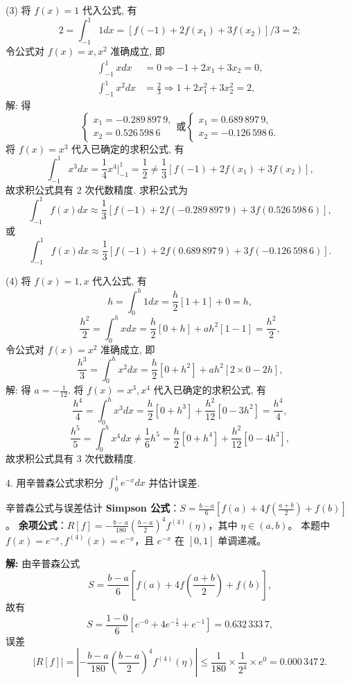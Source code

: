 \documentclass[a4paper,11pt]{ctexart}
\begin{document}
(3) 将 $f(x) = 1$ 代入公式, 有
\[
2 = \int_{-1}^1 1 dx = [f(-1) + 2f(x_1) + 3f(x_2)]/3 = 2;
\]
令公式对 $f(x) = x, x^2$ 准确成立, 即
\begin{align*}
\int_{-1}^1 x dx &= 0 \Rightarrow -1 + 2x_1 + 3x_2 = 0, \\
\int_{-1}^1 x^2 dx &= \frac{2}{3} \Rightarrow 1 + 2x_1^2 + 3x_2^2 = 2,
\end{align*}
解: 得
\[
\begin{cases}
x_1 = -0.289\,897\,9, \\
x_2 = 0.526\,598\,6
\end{cases}
\text{或}
\begin{cases}
x_1 = 0.689\,897\,9, \\
x_2 = -0.126\,598\,6.
\end{cases}
\]
将 $f(x) = x^3$ 代入已确定的求积公式, 有
\[
\int_{-1}^1 x^3 dx = \frac{1}{4}x^4 \Big|_{-1}^1 = \frac{1}{2} \neq \frac{1}{3} [f(-1) + 2f(x_1) + 3f(x_2)],
\]
故求积公式具有 2 次代数精度. 求积公式为
\[
\int_{-1}^1 f(x) dx \approx \frac{1}{3} [f(-1) + 2f(-0.289\,897\,9) + 3f(0.526\,598\,6)],
\]
或
\[
\int_{-1}^1 f(x) dx \approx \frac{1}{3} [f(-1) + 2f(0.689\,897\,9) + 3f(-0.126\,598\,6)].
\]

(4) 将 $f(x) = 1, x$ 代入公式, 有
\[
h = \int_0^h 1 dx = \frac{h}{2}[1+1] + 0 = h,
\]
\[
\frac{h^2}{2} = \int_0^h x dx = \frac{h}{2}[0+h] + ah^2[1-1] = \frac{h^2}{2},
\]
令公式对 $f(x) = x^2$ 准确成立, 即
\[
\frac{h^3}{3} = \int_0^h x^2 dx = \frac{h}{2}[0+h^2] + ah^2[2 \times 0 - 2h],
\]
解: 得 $a = -\frac{1}{12}$.
将 $f(x) = x^3, x^4$ 代入已确定的求积公式, 有
\[
\frac{h^4}{4} = \int_0^h x^3 dx = \frac{h}{2}[0+h^3] + \frac{h^2}{12}[0-3h^2] = \frac{h^4}{4},
\]
\[
\frac{h^5}{5} = \int_0^h x^4 dx \neq \frac{1}{6}h^5 = \frac{h}{2}[0+h^4] + \frac{h^2}{12}[0-4h^3],
\]
故求积公式具有 3 次代数精度.

\vspace{2em}

4. 用辛普森公式求积分 $\int_0^1 e^{-x} dx$ 并估计误差.

\begin{theorybox}{辛普森公式与误差估计}
\textbf{Simpson 公式}：$S = \frac{b-a}{6}\left[ f(a) + 4f\left(\frac{a+b}{2}\right) + f(b) \right]$。
\textbf{余项公式}：$R[f] = -\frac{b-a}{180} \left( \frac{b-a}{2} \right)^4 f^{(4)}(\eta)$，其中 $\eta \in (a,b)$。
本题中 $f(x)=e^{-x}, f^{(4)}(x)=e^{-x}$，且 $e^{-x}$ 在 $[0,1]$ 单调递减。
\end{theorybox}

\textbf{解: } 由辛普森公式
\[
S = \frac{b-a}{6}\left[ f(a) + 4f\left(\frac{a+b}{2}\right) + f(b) \right],
\]
故有
\[
S = \frac{1-0}{6} [e^{-0} + 4e^{-\frac{1}{2}} + e^{-1}] = 0.632\,333\,7,
\]
误差
\[
|R[f]| = \left| -\frac{b-a}{180} \left( \frac{b-a}{2} \right)^4 f^{(4)}(\eta) \right| \leqslant \frac{1}{180} \times \frac{1}{2^4} \times e^0 = 0.000\,347\,2.
\]
\end{document}
